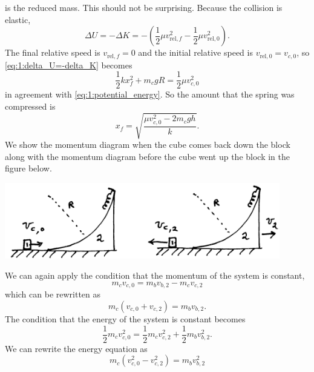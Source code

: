 \documentclass{esg8012exam}
\begin{document}
\begin{solution}
  is the reduced mass. This should not be surprising. Because the collision is elastic,
  \begin{equation} \Delta U = -\Delta K = -\left(\frac12 \mu v_{\text{rel},f}^2 - \frac12 \mu v_{\text{rel},0}^2\right). \label{eq:1:delta_U=-delta_K} \end{equation}
  The final relative speed is $v_{\text{rel}, f} = 0$ and the initial relative speed is $v_{\text{rel}, 0} = v_{c, 0}$, so \autoref{eq:1:delta_U=-delta_K} becomes
  \begin{equation} \frac12 k x_f^2 + m_c g R = \frac12\mu v_{c,0}^2 \label{eq:1:energy_substituted} \end{equation}
  in agreement with \autoref{eq:1:potential_energy}. So the amount that the spring was compressed is
  \begin{equation} x_f = \sqrt{\frac{\mu v_{c,0}^2 - 2m_c g h}{k}}. \label{eq:1:x_f} \end{equation}
  We show the momentum diagram when the cube comes back down the block along with the momentum diagram before the cube went up the block in the figure below.
  \begin{center}\includegraphics[width=0.9\textwidth]{exam2_s1_2}\end{center}
  We can again apply the condition that the momentum of the system is constant,
  \begin{equation} m_c v_{c,0} = m_b v_{b, 2} - m_c v_{c, 2} \label{eq:1:constant_momentum} \end{equation}
  which can be rewritten as
  \begin{equation} m_c(v_{c,0} + v_{c, 2}) = m_b v_{b,2}. \label{eq:1:momentum_constant_rewritten} \end{equation}
  The condition that the energy of the system is constant becomes
  \begin{equation} \frac{1}{2}m_c v_{c,0}^2=\frac{1}{2}m_c v_{c,2}^2+\frac{1}{2}m_b v_{b,2}^2. \label{eq:1:constant_energy} \end{equation}
  We can rewrite the energy equation as
  \begin{equation} m_c (v_{c,0}^2-v_{c,2}^2)=m_b v_{b,2}^2 \label{eq:1:constant_energy_rewritten} \end{equation}

\end{solution}
\end{document}
